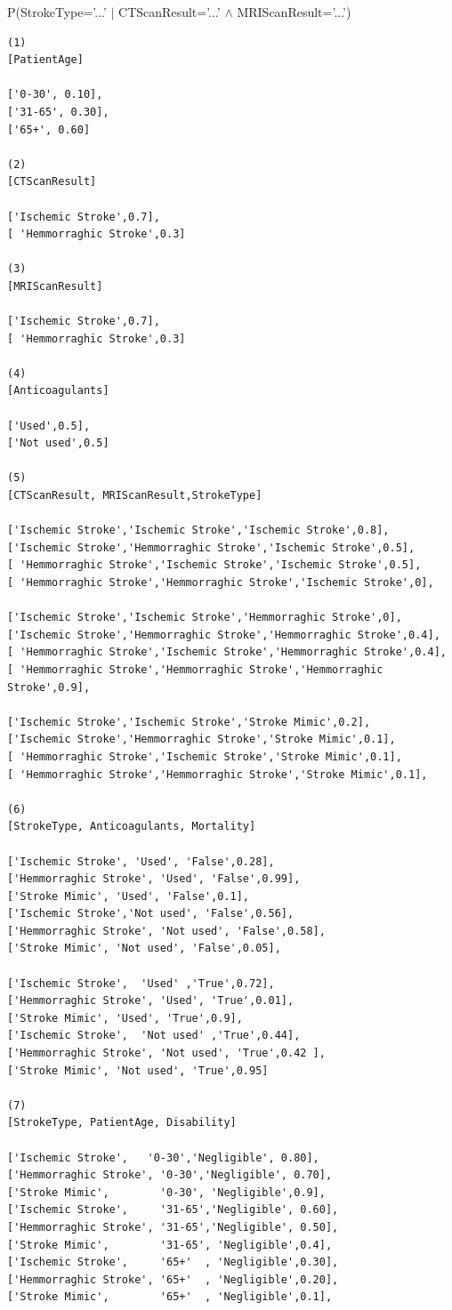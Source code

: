 \documentclass[a4paper, 11pt]{article}
\begin{document}
P(StrokeType='...' $|$ CTScanResult='...' $\land$  MRIScanResult='...') 
\begin{lstlisting}
(1)
[PatientAge]

['0-30', 0.10],
['31-65', 0.30],
['65+', 0.60]

(2)
[CTScanResult]

['Ischemic Stroke',0.7],
[ 'Hemmorraghic Stroke',0.3]

(3)
[MRIScanResult]

['Ischemic Stroke',0.7],
[ 'Hemmorraghic Stroke',0.3]

(4)
[Anticoagulants]

['Used',0.5],
['Not used',0.5]

(5)
[CTScanResult, MRIScanResult,StrokeType]

['Ischemic Stroke','Ischemic Stroke','Ischemic Stroke',0.8],
['Ischemic Stroke','Hemmorraghic Stroke','Ischemic Stroke',0.5],  
[ 'Hemmorraghic Stroke','Ischemic Stroke','Ischemic Stroke',0.5],
[ 'Hemmorraghic Stroke','Hemmorraghic Stroke','Ischemic Stroke',0], 

['Ischemic Stroke','Ischemic Stroke','Hemmorraghic Stroke',0],
['Ischemic Stroke','Hemmorraghic Stroke','Hemmorraghic Stroke',0.4], 
[ 'Hemmorraghic Stroke','Ischemic Stroke','Hemmorraghic Stroke',0.4],
[ 'Hemmorraghic Stroke','Hemmorraghic Stroke','Hemmorraghic Stroke',0.9],

['Ischemic Stroke','Ischemic Stroke','Stroke Mimic',0.2],
['Ischemic Stroke','Hemmorraghic Stroke','Stroke Mimic',0.1],    
[ 'Hemmorraghic Stroke','Ischemic Stroke','Stroke Mimic',0.1],
[ 'Hemmorraghic Stroke','Hemmorraghic Stroke','Stroke Mimic',0.1],

(6) 
[StrokeType, Anticoagulants, Mortality]

['Ischemic Stroke', 'Used', 'False',0.28],
['Hemmorraghic Stroke', 'Used', 'False',0.99],
['Stroke Mimic', 'Used', 'False',0.1],
['Ischemic Stroke','Not used', 'False',0.56],
['Hemmorraghic Stroke', 'Not used', 'False',0.58],
['Stroke Mimic', 'Not used', 'False',0.05],

['Ischemic Stroke',  'Used' ,'True',0.72],
['Hemmorraghic Stroke', 'Used', 'True',0.01],
['Stroke Mimic', 'Used', 'True',0.9],
['Ischemic Stroke',  'Not used' ,'True',0.44],
['Hemmorraghic Stroke', 'Not used', 'True',0.42 ],
['Stroke Mimic', 'Not used', 'True',0.95]

(7)
[StrokeType, PatientAge, Disability]

['Ischemic Stroke',   '0-30','Negligible', 0.80],
['Hemmorraghic Stroke', '0-30','Negligible', 0.70],
['Stroke Mimic',        '0-30', 'Negligible',0.9],
['Ischemic Stroke',     '31-65','Negligible', 0.60],
['Hemmorraghic Stroke', '31-65','Negligible', 0.50],
['Stroke Mimic',        '31-65', 'Negligible',0.4],
['Ischemic Stroke',     '65+'  , 'Negligible',0.30],
['Hemmorraghic Stroke', '65+'  , 'Negligible',0.20],
['Stroke Mimic',        '65+'  , 'Negligible',0.1],


\end{lstlisting}
\end{document}

